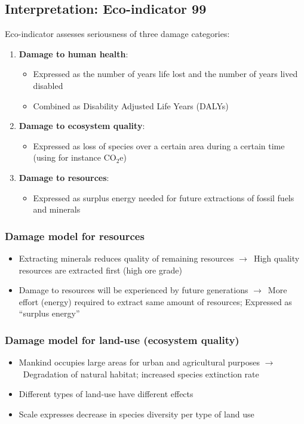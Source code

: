 \documentclass{article}
\begin{document}
\subsection{Interpretation: Eco-indicator 99}
Eco-indicator assesses seriousness of three damage categories:
\begin{enumerate}
    \item \textbf{Damage to human health}:
    \begin{itemize}[label=$\to$]
        \item Expressed as the number of years life lost and the number of years lived disabled
        \item Combined as Disability Adjusted Life Years (DALYs)
    \end{itemize}
    \item \textbf{Damage to ecosystem quality}:
    \begin{itemize}[label=$\to$]
        \item Expressed as loss of species over a certain area during a certain time (using for instance CO$_2$e)
    \end{itemize}
    \item \textbf{Damage to resources}:
    \begin{itemize}[label=$\to$]
        \item Expressed as surplus energy needed for future extractions of fossil fuels and minerals
    \end{itemize}
\end{enumerate}

\subsubsection{Damage model for resources}
\begin{itemize}
    \item Extracting minerals reduces quality of remaining resources $\to$\ High quality resources are extracted first (high ore grade)
    \item Damage to resources will be experienced by future generations $\to$\ More effort (energy) required to extract same amount of resources; Expressed as ``surplus energy''
\end{itemize}

\subsubsection{Damage model for land-use (ecosystem quality)}
\begin{itemize}
    \item Mankind occupies large areas for urban and agricultural purposes $\to$\ Degradation of natural habitat; increased species extinction rate
    \item Different types of land-use have different effects
    \item Scale expresses decrease in species diversity per type of land use
\end{itemize}
\end{document}
